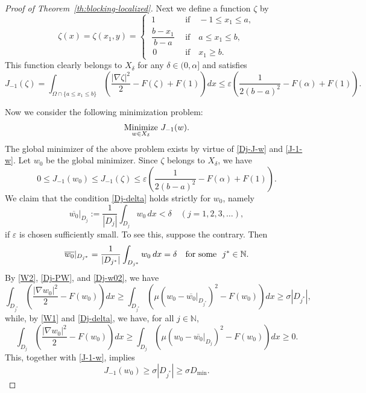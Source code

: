 \documentclass[a4paper,12pt,fullpage]{article}
\numberwithin{equation}{section}
\def\N{{\mathbb N}}
\def\ep{\varepsilon}
\begin{document}
\begin{proof}[Proof of Theorem~\ref{th:blocking-localized}]
Next we define a function $\zeta$ by
\begin{equation}\label{zeta1}
\zeta (x) = \zeta (x_1,y)= 
\begin{cases}
\ 1 \quad &\text{if}\quad -1 \leq x_1 \leq a, \\[2pt]
\ \dfrac{b- x_1}{b-a} \ \  &\text{if}\quad a \leq x_1 \leq b, \\[2pt]
\ \, 0 \quad& \text{if}\quad x_1\geq b .
\end{cases}
\end{equation}
This function clearly belongs to $X_\delta$ for any $\delta\in(0,\alpha]$ and satisfies
\[
J_{-1}(\zeta)=\int_{\Omega\cap\{a\leq x_1\leq b\}}\left( \frac{|\nabla \zeta|^2}{2}-F(\zeta)+F(1)\right)dx
\leq \ep\left(\frac{1}{2(b-a)^2}-F(\alpha)+F(1)\right).
\]

Now we consider the following minimization problem:
\begin{equation}\label{min-J}
\underset{w\in X_\delta}{\rm Minimize}\  J_{-1}(w).
\end{equation}
The global minimizer of the above problem exists by virtue of \eqref{Dj-J-w} and \eqref{J-1-w}. Let $w_0$ be the global minimizer. Since $\zeta$ belongs to $X_\delta$, we have
\begin{equation}\label{J-w0}
0\leq J_{-1}(w_0) \leq J_{-1}(\zeta)\leq \ep\left(\frac{1}{2(b-a)^2}-F(\alpha)+F(1)\right).
\end{equation}
We claim that the condition \eqref{Dj-delta} holds strictly for $w_0$, namely
\begin{equation}\label{Dj-delta-0}
\overline{w_0}|_{D_j}:=\frac{1}{|D_j|} \int_{D_j} w_0\hspace{2pt} dx < \delta \quad(j=1,2,3,\ldots),
\end{equation}
if $\ep$ is chosen sufficiently small. To see this, suppose the contrary. Then 
\begin{equation}\label{Dj-w02}
\overline{w_0}|_{D_{j^*}}=\frac{1}{|D_{j^*}|} \int_{D_{j^*}} w_0 \hspace{2pt} dx = \delta \quad \hbox{for some} \ \ j^*\in\N.
\end{equation}
By \eqref{W2}, \eqref{Dj-PW}, and \eqref{Dj-w02}, we have
\[
\int_{D_{j^*}}\left( \frac{|\nabla w_0|^2}{2}-F(w_0)\right)dx\geq  \int_{D_{j^*}}\left(\mu (w_0-\overline{w_0}|_{D_{j^*}})^2-F(w_0)\right)dx \geq \sigma |D_{j^{*}}|,
\]
while, by \eqref{W1} and \eqref{Dj-delta}, we have, for all $j\in\N$,
\[
\int_{D_j}\left( \frac{|\nabla w_0|^2}{2}-F(w_0)\right)dx\geq  \int_{D_j}\left(\mu (w_0-\overline{w_0}|_{D_j})^2-F(w_0)\right)dx \geq 0.
\]
This, together with \eqref{J-1-w}, implies
\begin{equation}\label{J-w03}
J_{-1}(w_0)\geq \sigma |D_{j^{*}}|\geq \sigma D_{\min}.
\end{equation}


\end{proof}
\end{document}
